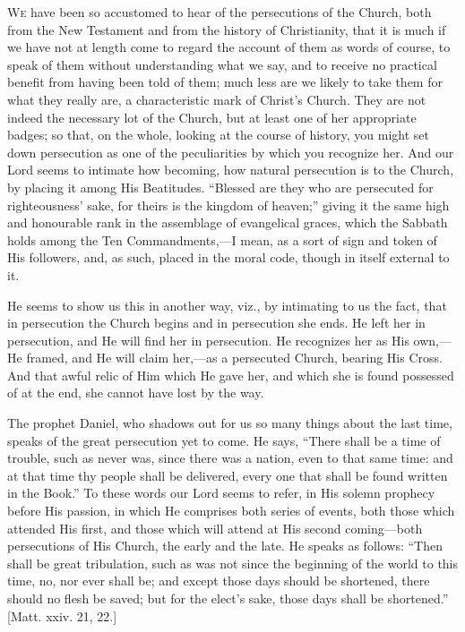 
W\textsc{e} have been so accustomed to hear of the persecutions of the
Church, both from the New Testament and from the history of
Christianity, that it is much if we have not at length come to regard
the account of them as words of course, to speak of them without
understanding what we say, and to receive no practical benefit from
having been told of them; much less are we likely to take them for
what they really are, a characteristic mark of Christ's Church. They
are not indeed the necessary lot of the Church, but at least one of
her appropriate badges; so that, on the whole, looking at the course
of history, you might set down persecution as one of the peculiarities
by which you recognize her. And our Lord seems to intimate how
becoming, how natural persecution is to the Church, by placing it
among His Beatitudes. ``Blessed are they who are persecuted for
righteousness' sake, for theirs is the kingdom of heaven;'' giving
it the same high and honourable rank in the assemblage of evangelical
graces, which the Sabbath holds among the Ten Commandments,—I mean,
as a sort of sign and token of His followers, and, as such, placed in
the moral code, though in itself external to it.

He seems to show us this in another way, viz., by intimating to us
the fact, that in persecution the Church begins and in persecution she
ends. He left her in persecution, and He will find her in
persecution. He recognizes her as His own,—He framed, and He will
claim her,—as a persecuted Church, bearing His Cross. And that awful
relic of Him which He gave her, and which she is found possessed of at
the end, she cannot have lost by the way.

The prophet Daniel, who shadows out for us so many things about the
last time, speaks of the great persecution yet to come. He says,
``There shall be a time of trouble, such as never was, since there
was a nation, even to that same time: and at that time thy people
shall be delivered, every one that shall be found written in the
Book.'' To these words our Lord seems to refer, in His solemn
prophecy before His passion, in which He comprises both series of
events, both those which attended His first, and those which will
attend at His second coming—both persecutions of His Church, the
early and the late. He speaks as follows: ``Then shall be great
tribulation, such as was not since the beginning of the world to this
time, no, nor ever shall be; and except those days should be
shortened, there should no flesh be saved; but for the elect's sake,
those days shall be shortened.'' [Matt. xxiv. 21, 22.]

